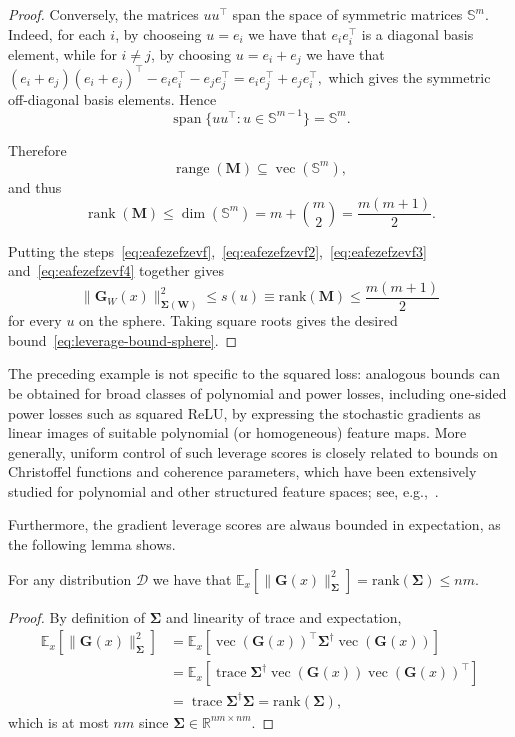 \documentclass[11pt]{article}
\renewcommand{\vec}{\operatorname{vec}}
\newcommand{\mat}[1]{\bm{#1}}
\newcommand{\cD}{\mathcal{D}}
\newcommand{\R}{\mathbb{R}}
\newcommand{\EE}[2]{\mathbb{E}_{#1}\left[#2\right] }
\DeclareMathOperator{\trace}{trace}
\begin{document}
\begin{proof}
Conversely, the matrices $uu^\top$ span the space of symmetric matrices $\mathbb{S}^m$. Indeed, for each
$i$, by chooseing $u=e_i$ we have that
$
e_i e_i^\top
$
is a diagonal basis element, while for $i\neq j$,  by choosing $u=e_i+e_j$ we have that
$
(e_i+e_j)(e_i+e_j)^\top
-
e_i e_i^\top
-
e_j e_j^\top
=
e_i e_j^\top+e_j e_i^\top,
$
which gives the symmetric off-diagonal basis elements. Hence
\[
\operatorname{span}\{uu^\top:u\in\mathbb{S}^{m-1}\}
=
\mathbb{S}^m.
\]

Therefore
\[
\operatorname{range}(\mat{M})
\subseteq
\operatorname{vec}(\mathbb{S}^m),
\]
and thus
\begin{equation}  \label{eq:eafezefzevf4}
\operatorname{rank}(\mat{M})
\leq
\dim(\mathbb{S}^m)
=
m+\binom{m}{2}
=
\frac{m(m+1)}{2}.
\end{equation}



Putting the steps~\eqref{eq:eafezefzevf},~\eqref{eq:eafezefzevf2},~\eqref{eq:eafezefzevf3} and~\eqref{eq:eafezefzevf4} 
together gives 
 $$ \| \mat{G}_W(x)\|_{\mat{\Sigma}(\mat{W})}^2 \leq s(u) \equiv \mathrm{rank}(\mat{M}) \leq \frac{m(m+1)}{2}$$
  for every $u$ on the sphere. Taking square roots gives the desired bound~\eqref{eq:leverage-bound-sphere}.

\end{proof}


The preceding example is not specific to the squared loss: analogous bounds can be obtained for broad classes of polynomial and power losses, including one-sided power losses such as squared ReLU, by expressing the stochastic gradients as linear images of suitable polynomial (or homogeneous) feature maps. More generally, uniform control of such leverage scores is closely related to bounds on Christoffel functions and coherence parameters, which have been extensively studied for polynomial and other structured feature spaces; see, e.g.,~\cite{CohenMigliorati2017,RauhutWard2012,PauwelsBachVert2018}.

Furthermore, the gradient leverage scores are alwaus bounded in expectation, as the following lemma shows.
\begin{lemma}\label{lem:expectation}
For any distribution $\cD$ we have that $\displaystyle \EE{x}{\|\mat{G}(x)\|_{\mat{\Sigma}}^2} = \mathrm{rank}(\mat{\Sigma}) \le nm.$
\end{lemma}
\begin{proof}
By definition of $\mat{\Sigma}$ and linearity of trace and expectation,
\begin{align*}
 \EE{x}{\|\mat{G}(x)\|_{\mat{\Sigma}}^2} 
 &= \EE{x}{\vec(\mat{G}(x))^\top \mat{\Sigma}^\dagger \vec(\mat{G}(x))}  \\
 &= \EE{x}{\trace{\mat{\Sigma}^\dagger \vec(\mat{G}(x))\vec(\mat{G}(x))^\top}}  \\
 &= \trace{\mat{\Sigma}^\dagger \mat{\Sigma}} = \mathrm{rank}(\mat{\Sigma}),
 \end{align*}
which is at most $nm$ since $\mat{\Sigma} \in \R^{nm\times nm}$.
\end{proof}
\end{document}
